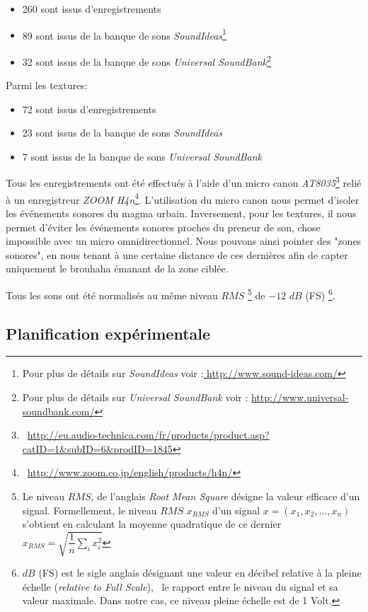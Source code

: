 \begin{itemize}
\item 260 sont issus d’enregistrements
\item 89 sont issus de la banque de sons \emph{SoundIdeas}\footnote{Pour plus de détails sur \emph{SoundIdeas} voir :\url{ http://www.sound-ideas.com/}}
\item 32 sont issus de la banque de sons \emph{Universal SoundBank}\footnote{Pour plus de détails sur \emph{Universal SoundBank} voir : \url{http://www.universal-soundbank.com/}}
\end{itemize}

Parmi les textures:

\begin{itemize}
\item 72 sont issus d’enregistrements
\item 23 sont issus de la banque de sons \emph{SoundIdeas}
\item 7 sont issus de la banque de sons \emph{Universal SoundBank}
\end{itemize}

Tous les enregistrements ont été effectués à l’aide d'un micro canon \emph{AT8035}\footnote{\Cf~\url{http://eu.audio-technica.com/fr/products/product.asp?catID=1&subID=6&prodID=1845}} relié à un enregistreur \emph{ZOOM H4n}\footnote{\Cf~\url{http://www.zoom.co.jp/english/products/h4n/}}. L’utilisation du micro canon nous permet d’isoler les événements sonores du magma urbain. Inversement, pour les textures, il nous permet d’éviter les événements sonores proches du preneur de son, chose impossible avec un micro omnidirectionnel. Nous pouvons ainsi pointer des "zones sonores", en nous tenant à une certaine distance de ces dernières afin de capter uniquement le brouhaha émanant de la zone ciblée.

Tous les sons ont été normalisés au même niveau $RMS$ \footnote{Le niveau $RMS$, de l'anglais \emph{Root Mean Square} désigne la valeur efficace d'un signal. Formellement, le niveau $RMS$ $x_{RMS}$ d'un signal $x=(x_1,x_2,\ldots,x_n)$ s'obtient en calculant la moyenne quadratique de ce dernier $x_{RMS}=\sqrt{\dfrac{1}{n}\sum\limits_{i} x_i^2}$} de $-12$ $dB$ (FS) \footnote{$dB$ (FS) est le sigle anglais désignant une valeur en décibel relative à la pleine échelle (\emph{relative to Full Scale}), \ie~le rapport entre le niveau du signal et sa valeur maximale. Dans notre cas, ce niveau pleine échelle est de 1 Volt.}.

\subsection{Planification expérimentale}

